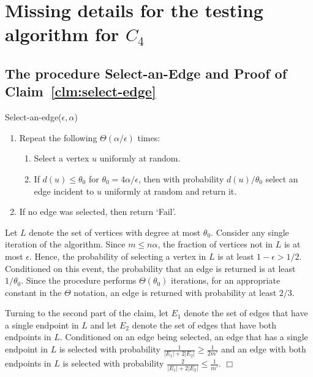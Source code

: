 \documentclass{article}
\newcommand{\eps}{\epsilon}
\newenvironment{proofof}[1]{\smallskip\noindent{\bf Proof of #1:}}%
        {\hspace*{\fill}$\Box$\par}
\begin{document}
\appendix

\section{Missing details for the testing algorithm for $C_4$}\label{sec:4.1}
 
\subsection{The procedure \textsf{Select-an-Edge} and Proof of Claim~\ref{clm:select-edge}} \label{append:sample-edge}
\textsf{Select-an-edge}($\epsilon,\alpha$)\label{alg:select-edge}
\begin{enumerate}
\item Repeat the following $\Theta(\alpha/\eps)$ times:
\begin{enumerate}
  \item Select a vertex $u$ uniformly at random.
  \item If $d(u) \leq \theta_0$ for $\theta_0=4\alpha/\eps$, then with probability $d(u)/\theta_0$ select an edge incident to $u$ uniformly at random and return it. 
\end{enumerate}
\item If no edge was selected, then return `Fail'.
\end{enumerate}

\begin{proofof}{Claim~\ref{clm:select-edge}}
Let $L$ denote the set of vertices with degree at most $\theta_0$.
Consider any single iteration of the algorithm.
Since $m\leq n\alpha$, the fraction of vertices not in $L$
is at most $\eps$.  Hence, the probability of selecting a vertex in $L$ is at least $1-\eps > 1/2$.
Conditioned on this event, the probability that an edge is returned is at least $1/\theta_0$.
Since the procedure performs $\Theta(\theta_0)$ iterations, for an appropriate constant in the $\Theta$ notation, an edge is returned with probability at least $2/3$.

Turning to the second part of the claim,
let $E_1$ denote the set of edges that have a single endpoint in $L$ and let $E_2$ denote the set of edges that have both endpoints in $L$.
Conditioned on an edge being selected, an edge that has a single endpoint in $L$ is selected with probability 
$\frac{1}{|E_1| + 2|E_2|} \geq \frac{1}{2m'}$ and an edge with both endpoints in $L$ is selected with probability
$\frac{2}{|E_1| + 2|E_2|} \leq \frac{1}{m'}$.
\end{proofof}
\end{document}
